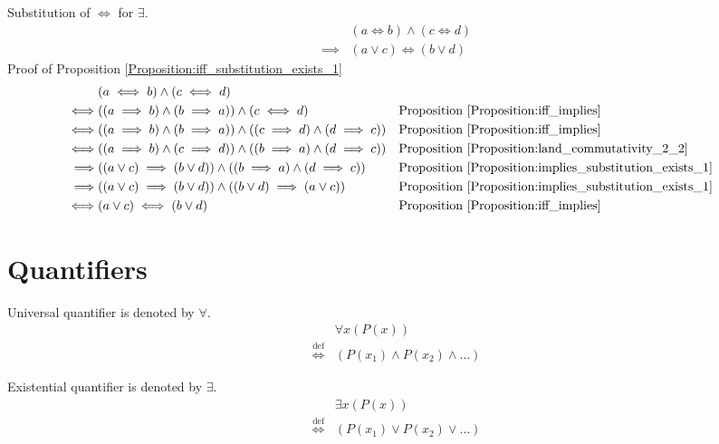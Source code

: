 \begin{prop}
\label{Proposition:iff_substitution_exists_1}
Substitution of $\iff$ for $\exists$.
\begin{align*}
& (a \iff b) \land (c \iff d) \\
\implies & (a \lor c) \iff (b \lor d)
\end{align*}
Proof of Proposition \ref{Proposition:iff_substitution_exists_1}
\begin{align*}
& (a \iff b) \land (c \iff d) \\
\iff & ((a \implies b) \land (b \implies a)) \land (c \iff d)
& & \text{Proposition \ref{Proposition:iff_implies}} \\
\iff & ((a \implies b) \land (b \implies a)) \land ((c \implies d) \land (d \implies c))
& & \text{Proposition \ref{Proposition:iff_implies}} \\
\iff & ((a \implies b) \land (c \implies d)) \land ((b \implies a) \land (d \implies c))
& & \text{Proposition \ref{Proposition:land_commutativity_2_2}} \\
\implies & ((a \lor c) \implies (b \lor d)) \land ((b \implies a) \land (d \implies c))
& & \text{Proposition \ref{Proposition:implies_substitution_exists_1}} \\
\implies & ((a \lor c) \implies (b \lor d)) \land ((b \lor d) \implies (a \lor c))
& & \text{Proposition \ref{Proposition:implies_substitution_exists_1}} \\
\iff & (a \lor c) \iff (b \lor d)
& & \text{Proposition \ref{Proposition:iff_implies}} \\
\end{align*}
\end{prop}

\section{Quantifiers}
\begin{defn}
Universal quantifier is denoted by $\forall$.
\begin{align*}
& \forall x (P(x)) \\
\overset{\operatorname{def}}{\iff} & (P(x_1) \land P(x_2) \land \dots)
\end{align*}
\end{defn}

\begin{defn}
Existential quantifier is denoted by $\exists$.
\begin{align*}
& \exists x (P(x)) \\
\overset{\operatorname{def}}{\iff} & (P(x_1) \lor P(x_2) \lor \dots)
\end{align*}
\end{defn}

